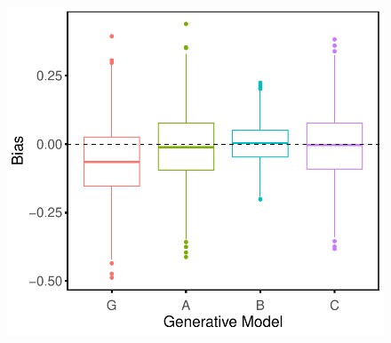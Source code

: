 \documentclass[
  11pt,
  a4paper,
]{article}
\begin{document}
\begin{figure}[H]
\begin{minipage}{0.50\linewidth}
{\includegraphics{research-report_files/figure-pdf/fig-simulation-results-2.pdf}

}

\end{minipage}%
\newline
\begin{minipage}{0.50\linewidth}


\end{minipage}
\end{figure}
\end{document}
